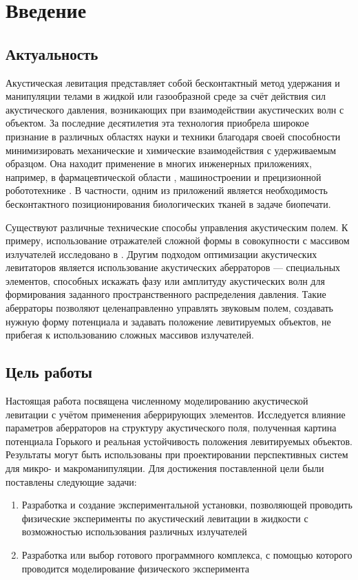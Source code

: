\section{Введение}
\label{sec:Chapter0} 
\subsection{Актуальность}
Акустическая левитация представляет собой бесконтактный метод удержания и манипуляции телами в жидкой или газообразной среде за счёт действия сил акустического давления, возникающих при взаимодействии акустических волн с объектом. За последние десятилетия эта технология приобрела широкое признание в различных областях науки и техники благодаря своей способности минимизировать механические и химические взаимодействия с удерживаемым образцом. Она находит применение в многих инженерных приложениях, например, в фармацевтической области \cite{appliance_medicine}, машиностроении \cite{appliance_bearings} и прецизионной робототехнике \cite{appliance_robot}. В частности, одним из приложений является необходимость бесконтактного позиционирования биологических тканей в задаче биопечати. 

Существуют различные технические способы управления акустическим полем. К примеру, использование отражателей сложной формы в совокупности с массивом излучателей исследовано в \cite{nature_acoustics}. Другим подходом оптимизации акустических левитаторов является использование акустических аберраторов — специальных элементов, способных искажать фазу или амплитуду акустических волн для формирования заданного пространственного распределения давления. Такие аберраторы позволяют целенаправленно управлять звуковым полем, создавать нужную форму потенциала и задавать положение левитируемых объектов, не прибегая к использованию сложных массивов излучателей.

\subsection{Цель работы}

Настоящая работа посвящена численному моделированию акустической левитации с учётом применения аберрирующих элементов. Исследуется влияние параметров аберраторов на структуру акустического поля, полученная картина потенциала Горького и реальная устойчивость положения левитируемых объектов. Результаты могут быть использованы при проектировании перспективных систем для микро- и макроманипуляции. Для достижения поставленной цели были поставлены следующие задачи:
\begin{enumerate}
	\item Разработка и создание экспериментальной установки, позволяющей проводить физические эксперименты по акустический левитации в жидкости с возможностью использования различных излучателей
	\item Разработка или выбор готового программного комплекса, с помощью которого проводится моделирование физического эксперимента
\end{enumerate}

\newpage

